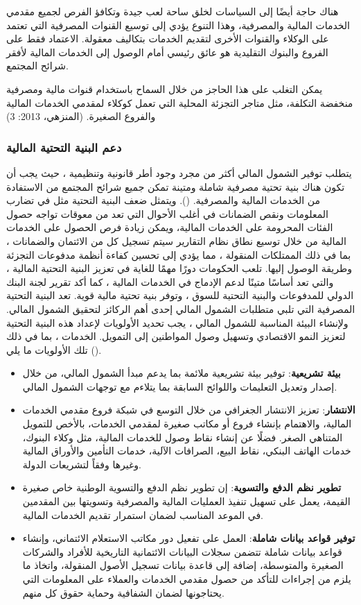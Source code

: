 \documentclass[10pt,a4paper]{report}
\begin{document}
\begin{doublespacing}
هناك حاجة أيضًا إلى السياسات لخلق ساحة لعب جيدة وتكافؤ الفرص لجميع مقدمي الخدمات المالية والمصرفية، وهذا التنوع يؤدي إلى توسيع القنوات المصرفية التي تعتمد على الوكلاء والقنوات الأخرى لتقديم الخدمات بتكاليف معقولة. الاعتماد فقط على الفروع والبنوك التقليدية هو عائق رئيسي أمام الوصول إلى الخدمات المالية لأفقر شرائح المجتمع. 

يمكن التغلب على هذا الحاجز من خلال السماح باستخدام قنوات مالية ومصرفية منخفضة التكلفة، مثل متاجر التجزئة المحلية التي تعمل كوكلاء لمقدمي الخدمات المالية والفروع الصغيرة. (المنزهي، 2013: 3)
\subsubsection{دعم البنية التحتية المالية}
يتطلب توفير الشمول المالي أكثر من مجرد وجود أطر قانونية وتنظيمية ، حيث يجب أن تكون هناك بنية تحتية مصرفية شاملة ومتينة تمكن جميع شرائح المجتمع من الاستفادة من الخدمات المالية والمصرفية. (). ويتمثل ضعف البنية التحتية مثل في تضارب المعلومات ونقص الضمانات في أغلب الأحوال التي تعد من معوقات تواجه حصول الفئات المحرومة على الخدمات المالية، ويمكن زيادة فرص الحصول على الخدمات المالية من خلال توسيع نطاق نظام التقارير سيتم تسجيل كل من الائتمان والضمانات ، بما في ذلك الممتلكات المنقولة ، مما يؤدي إلى تحسين كفاءة أنظمة مدفوعات التجزئة وطريقة الوصول إليها. تلعب الحكومات دورًا مهمًا للغاية في تعزيز البنية التحتية المالية ، والتي تعد أساسًا متينًا لدعم الإدماج في الخدمات المالية ، كما أكد تقرير لجنة البنك الدولي للمدفوعات والبنية التحتية للسوق ، وتوفر بنية تحتية مالية قوية. تعد البنية التحتية المصرفية التي تلبي متطلبات الشمول المالي إحدى أهم الركائز لتحقيق الشمول المالي. ولإنشاء البيئة المناسبة للشمول المالي ، يجب تحديد الأولويات لإعداد هذه البنية التحتية لتعزيز النمو الاقتصادي وتسهيل وصول المواطنين إلى التمويل. الخدمات ، بما في ذلك تلك الأولويات ما يلي ().

\begin{itemize}
	\item \textbf{بيئة تشريعية}: توفير بيئة تشريعية ملائمة بما يدعم مبدأ الشمول المالي، من خلال إصدار وتعديل التعليمات واللوائح السابقة بما يتلاءم مع توجهات الشمول المالي.
	\item \textbf{الانتشار}: تعزيز الانتشار الجغرافي من خلال التوسع في شبكة فروع مقدمي الخدمات المالية، والاهتمام بإنشاء فروع أو مكاتب صغيرة لمقدمي الخدمات، بالأخص للتمويل المتناهي الصغر. فضلًا عن إنشاء نقاط وصول للخدمات المالية، مثل وكلاء البنوك، خدمات الهاتف البنكي، نقاط البيع، الصرافات الآلية، خدمات التأمين والأوراق المالية وغيرها وفقاً لتشريعات الدولة.
	\item \textbf{تطوير نظم الدفع والتسوية}: إن تطوير نظم الدفع والتسوية الوطنية خاص صغيرة القيمة، يعمل على تسهيل تنفيذ العمليات المالية والمصرفية وتسويتها بين المقدمين في الموعد المناسب لضمان استمرار تقديم الخدمات المالية.
	\item \textbf{توفير قواعد بيانات شاملة}: العمل على تفعيل دور مكاتب الاستعلام الائتماني، وإنشاء قواعد بيانات شاملة تتضمن سجلات البيانات الائتمانية التاريخية للأفراد والشركات الصغيرة والمتوسطة، إضافة إلى قاعدة بيانات تسجيل الأصول المنقولة، واتخاذ ما يلزم من إجراءات للتأكد من حصول مقدمي الخدمات والعملاء على المعلومات التي يحتاجونها لضمان الشفافية وحماية حقوق كل منهم.
\end{itemize}

\end{doublespacing}
\end{document}
